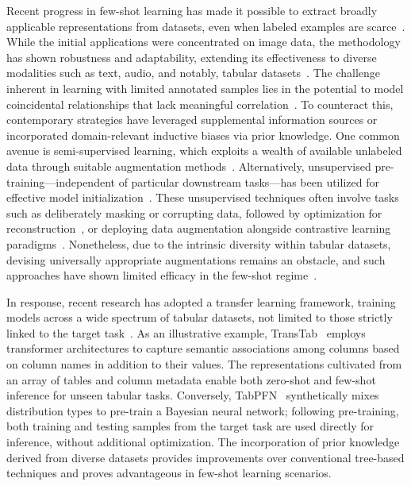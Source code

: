Recent progress in few-shot learning has made it possible to extract broadly applicable representations from datasets, even when labeled examples are scarce~\cite{chen2018closer}. While the initial applications were concentrated on image data, the methodology has shown robustness and adaptability, extending its effectiveness to diverse modalities such as text, audio, and notably, tabular datasets~\cite{majumder2022few,nam2023stunt,schick2021exploiting}. The challenge inherent in learning with limited annotated samples lies in the potential to model coincidental relationships that lack meaningful correlation~\cite{bartlett2021deep}. To counteract this, contemporary strategies have leveraged supplemental information sources or incorporated domain-relevant inductive biases via prior knowledge. One common avenue is semi-supervised learning, which exploits a wealth of available unlabeled data through suitable augmentation methods~\cite{ucar2021subtab,yoon2020vime}. Alternatively, unsupervised pre-training—independent of particular downstream tasks—has been utilized for effective model initialization~\cite{somepalli2021saint}. These unsupervised techniques often involve tasks such as deliberately masking or corrupting data, followed by optimization for reconstruction~\cite{arik2021tabnet,majmundar2022met}, or deploying data augmentation alongside contrastive learning paradigms~\cite{bahri2022scarf,chen2020simple}. Nonetheless, due to the intrinsic diversity within tabular datasets, devising universally appropriate augmentations remains an obstacle, and such approaches have shown limited efficacy in the few-shot regime~\cite{nam2023stunt}.

In response, recent research has adopted a transfer learning framework, training models across a wide spectrum of tabular datasets, not limited to those strictly linked to the target task~\cite{zhang2023generative,levin2022transfer,zhu2023xtab}. As an illustrative example, TransTab~\cite{wang2022transtab} employs transformer architectures to capture semantic associations among columns based on column names in addition to their values. The representations cultivated from an array of tables and column metadata enable both zero-shot and few-shot inference for unseen tabular tasks. Conversely, TabPFN~\cite{hollmann2022tabpfn} synthetically mixes distribution types to pre-train a Bayesian neural network; following pre-training, both training and testing samples from the target task are used directly for inference, without additional optimization. The incorporation of prior knowledge derived from diverse datasets provides improvements over conventional tree-based techniques and proves advantageous in few-shot learning scenarios.

